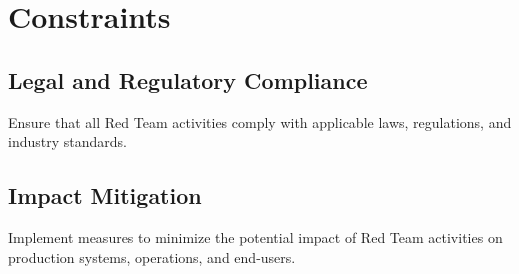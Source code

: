 \section*{Constraints}

\subsection*{ Legal and Regulatory Compliance }
        Ensure that all Red Team activities comply with applicable laws, regulations, and industry standards.
 \subsection*{   Impact Mitigation }
        Implement measures to minimize the potential impact of Red Team activities on production systems, operations, and end-users.
